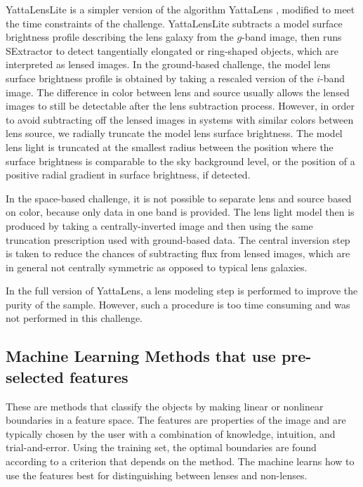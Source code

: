 \documentclass[useAMS,usenatbib]{mnras}
\begin{document}
YattaLensLite is a simpler version of the algorithm YattaLens \citep{2017arXiv170401585S}, modified to meet the time constraints of the challenge.
YattaLensLite subtracts a model surface brightness profile describing the lens galaxy from the $g$-band image, then runs SExtractor to detect tangentially elongated or ring-shaped objects, which are interpreted as lensed images.
In the ground-based challenge, the model lens surface brightness profile is obtained by taking a rescaled version of the $i$-band image.
The difference in color between lens and source usually allows the lensed images to still be detectable after the lens subtraction process.
However, in order to avoid subtracting off the lensed images in systems with similar colors between lens source, we radially truncate the model lens surface brightness.
The model lens light is truncated at the smallest radius between the position where the surface brightness is comparable to the sky background level, or the position of a positive radial gradient in surface brightness, if detected.

In the space-based challenge, it is not possible to separate lens and source based on color, because only data in one band is provided. The lens light model then is produced by taking a centrally-inverted image and then using the same truncation prescription used with ground-based data. The central inversion step is taken to reduce the chances of subtracting flux from lensed images, which are in general not centrally symmetric as opposed to typical lens galaxies.

In the full version of YattaLens, a lens modeling step is performed to improve the purity of the sample. However, such a procedure is too time consuming and was not performed in this challenge.

\subsection{Machine Learning Methods that use pre-selected features}

These are methods that classify the objects by making linear or nonlinear boundaries in a feature space.  The features are properties of the image and are typically chosen by the user with a combination of knowledge, intuition, and trial-and-error.  Using the training set, the optimal boundaries are found according to a criterion that depends on the method.  The machine learns how to use the features best for distinguishing between lenses and non-lenses.
\end{document}
